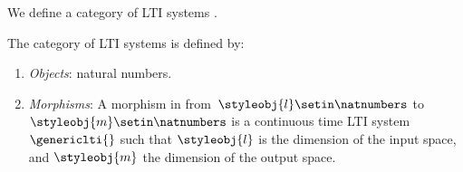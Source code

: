 We define a category of LTI systems \LTI.

\begin{ctdefinition}
    \label{def:LTICat}
    The category \LTI of LTI systems is defined by:
    \begin{enumerate}
        \item \emph{Objects}: natural numbers.
        \item \emph{Morphisms}: A morphism in \LTI from~$\styleobj{l}\setin \natnumbers$ to~$\styleobj{m}\setin \natnumbers$ is a continuous time LTI system~$\genericlti{}$ such that $\styleobj{l}$ is the dimension of the input space, and $\styleobj{m}$ the dimension of the output space.


\end{enumerate}
\end{ctdefinition}
